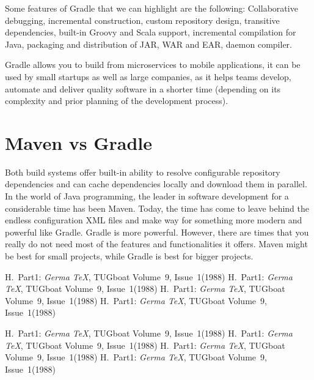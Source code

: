 \documentclass[a4paper,11pt]{article}
\begin{document}
Some features of Gradle that we can highlight are the following: Collaborative 
debugging, incremental construction, custom repository design, transitive 
dependencies, built-in Groovy and Scala support, incremental compilation for 
Java, packaging and distribution of JAR, WAR and EAR, daemon compiler.

Gradle allows you to build from microservices to mobile applications, it can 
be used by small startups as well as large companies, as it helps teams 
develop, automate and deliver quality software in a shorter time (depending on 
its complexity and prior planning of the development process)\cite{Gradle}.

\section{Maven vs Gradle}
Both build systems offer built-in ability to resolve configurable repository 
dependencies and can cache dependencies locally and download them in parallel. 
In the world of Java programming, the leader in software development for a
considerable time has been Maven. Today, the time has come to leave behind the 
endless configuration XML files and make way for something more modern and 
powerful like Gradle. Gradle is more powerful. However, there are times that 
you really do not need most of the features and functionalities it offers. 
Maven might be best for small projects, while Gradle is best for bigger 
projects\cite{DZone}.

\begin{thebibliography}{99}
     H.~Part1: \emph{Germa \TeX}, TUGboat Volume~9, Issue~1(1988) 
     H.~Part1: \emph{Germa \TeX}, TUGboat Volume~9, Issue~1(1988) 
     H.~Part1: \emph{Germa \TeX}, TUGboat Volume~9, Issue~1(1988) 
     H.~Part1: \emph{Germa \TeX}, TUGboat Volume~9, Issue~1(1988) 

     H.~Part1: \emph{Germa \TeX}, TUGboat Volume~9, Issue~1(1988) 
     H.~Part1: \emph{Germa \TeX}, TUGboat Volume~9, Issue~1(1988) 
     H.~Part1: \emph{Germa \TeX}, TUGboat Volume~9, Issue~1(1988) 
     H.~Part1: \emph{Germa \TeX}, TUGboat Volume~9, Issue~1(1988) 
\end{thebibliography}
\end{document}
